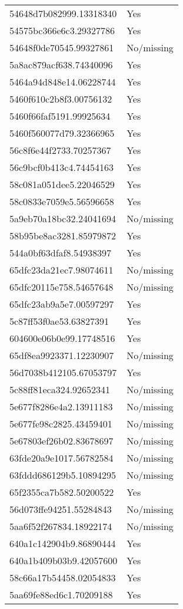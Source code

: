 \begin{tabular}{ll}
54648d7b082999.13318340 & Yes \\
54575bc366e6c3.29327786 & Yes \\
54648f0de70545.99327861 & No/missing \\
5a8ac879acf638.74340096 & Yes \\
5464a94d848e14.06228744 & Yes \\
5460f610c2b8f3.00756132 & Yes \\
5460f66faf5191.99925634 & Yes \\
5460f560077d79.32366965 & Yes \\
56c8f6e44f2733.70257367 & Yes \\
56c9bcf0b413c4.74454163 & Yes \\
58c081a051dee5.22046529 & Yes \\
58c0833e7059e5.56596658 & Yes \\
5a9eb70a18bc32.24041694 & No/missing \\
58b95be8ac3281.85979872 & Yes \\
544a0bf63dfaf8.54938397 & Yes \\
65dfc23da21ec7.98074611 & No/missing \\
65dfc20115e758.54657648 & No/missing \\
65dfc23ab9a5e7.00597297 & Yes \\
5c87ff53f0ae53.63827391 & Yes \\
604600e06b0e99.17748516 & Yes \\
65df8ea9923371.12230907 & No/missing \\
56d7038b412105.67053797 & Yes \\
5c88ff81eca324.92652341 & No/missing \\
5e677f8286e4a2.13911183 & No/missing \\
5e677fe98c2825.43459401 & No/missing \\
5e67803ef26b02.83678697 & No/missing \\
63fde20a9e1017.56782584 & No/missing \\
63fddd686129b5.10894295 & No/missing \\
65f2355ca7b582.50200522 & Yes \\
56d073ffe94251.55284843 & No/missing \\
5aa6f52f267834.18922174 & No/missing \\
640a1c142904b9.86890444 & Yes \\
640a1b409b03b9.42057600 & Yes \\
58c66a17b54458.02054833 & Yes \\
5aa69fe88ed6c1.70209188 & Yes \\

\end{tabular}
